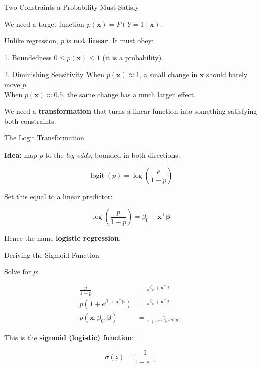 \documentclass[aspectratio=169, professionalfonts]{beamer}
\begin{document}
\begin{frame}{Two Constraints a Probability Must Satisfy}

We need a target function $p(\mathbf{x}) = P(Y=1\mid\mathbf{x})$.

\bigskip

Unlike regression, $p$ is \textbf{not linear}. It must obey:

\bigskip

\begin{block}{1. Boundedness}
$0 \le p(\mathbf{x}) \le 1$ \quad (it is a probability).
\end{block}

\begin{block}{2. Diminishing Sensitivity}
When $p(\mathbf{x}) \approx 1$, a small change in $\mathbf{x}$ should barely
move $p$. \\[4pt]
When $p(\mathbf{x}) \approx 0.5$, the same change has a much larger effect.
\end{block}

\bigskip

We need a \textbf{transformation} that turns a linear function into something satisfying both constraints.

\end{frame}

\begin{frame}{The Logit Transformation}

\textbf{Idea:} map $p$ to the \emph{log-odds}, bounded in both directions.

$$\operatorname{logit}(p) = \log\!\left(\frac{p}{1-p}\right)$$

\bigskip

Set this equal to a linear predictor:

$$\log\!\left(\frac{p}{1-p}\right) = \beta_0 + \mathbf{x}^\top\bm{\beta}$$

\bigskip

Hence the name \textbf{logistic regression}.

\end{frame}

\begin{frame}{Deriving the Sigmoid Function}

Solve for $p$:

\begin{align*}
\frac{p}{1-p} &= e^{\beta_0 + \mathbf{x}^\top\bm{\beta}} \\[6pt]
p\!\left(1 + e^{\beta_0 + \mathbf{x}^\top\bm{\beta}}\right) &= e^{\beta_0 + \mathbf{x}^\top\bm{\beta}} \\[6pt]
p(\mathbf{x};\beta_0,\bm{\beta})
  &= \frac{1}{1 + e^{-(\beta_0 + \mathbf{x}^\top\bm{\beta})}}
\end{align*}

\bigskip

This is the \textbf{sigmoid (logistic) function}:

$$\boxed{\sigma(z) = \frac{1}{1+e^{-z}}}$$

\end{frame}
\end{document}
